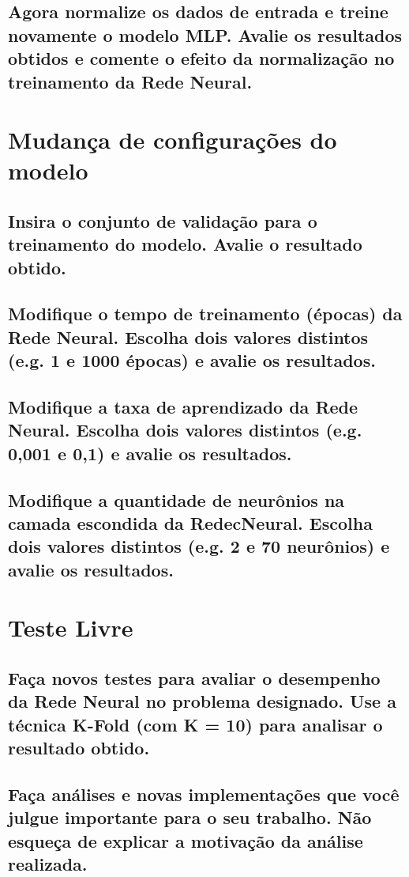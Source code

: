 \documentclass[12pt]{article}
\begin{document}
\subsection{Agora normalize os dados de entrada e treine novamente o modelo MLP.	Avalie os resultados obtidos e comente o efeito da normalização no	treinamento da Rede Neural.}
	
\section{Mudança de configurações do modelo}

\subsection{Insira o conjunto de validação para o treinamento do modelo. Avalie o resultado obtido.}

\subsection{Modifique o tempo de treinamento (épocas) da Rede Neural. Escolha dois valores distintos (e.g. 1 e 1000 épocas) e avalie os resultados.}

\subsection{Modifique a taxa de aprendizado da Rede Neural. Escolha dois valores distintos (e.g. 0,001 e 0,1) e avalie os resultados.}

\subsection{Modifique a quantidade de neurônios na camada escondida da RedecNeural. Escolha dois valores distintos (e.g. 2 e 70 neurônios) e avalie os	resultados.}


\section{Teste Livre}

\subsection{Faça novos testes para avaliar o desempenho da Rede Neural no	problema designado. Use a técnica K-Fold (com K = 10) para analisar o	resultado obtido.}

\subsection{Faça análises e novas implementações que você julgue importante para o seu trabalho. Não esqueça de explicar a motivação da análise realizada.}
\end{document}
